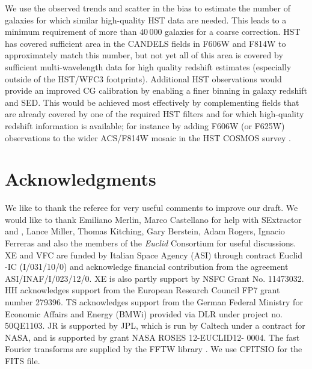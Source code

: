 \documentclass[useAMS,usenatbib]{mnras}
\begin{document}
We use the observed trends and scatter in the bias to estimate the number of galaxies for which similar high-quality HST data are needed. This leads to a minimum requirement of more than $40\,000$ galaxies for a coarse correction. HST has covered sufficient area in the CANDELS fields in F606W and
F814W to approximately match this number, but not yet all of this area is covered by sufficient
multi-wavelength data for high quality redshift estimates (especially outside of the HST/WFC3 footprints). Additional HST observations would provide an improved CG calibration by enabling a
finer binning in galaxy redshift and SED. This would be achieved most effectively by complementing
fields that are already covered by one of the required HST filters and for which high-quality redshift information is available; for instance by adding F606W (or F625W) observations to the wider ACS/F814W
mosaic in the HST COSMOS survey \citep{scoville07hst}.


\section*{Acknowledgments}

We like to thank the referee for very useful comments to improve our draft.
We would like to thank Emiliano Merlin, Marco Castellano for help with
{\sc SExtractor} and {}, Lance Miller, Thomas
Kitching, Gary Berstein, Adam Rogers, Ignacio Ferreras and also the
members of the {\it Euclid} Consortium for useful discussions. XE and VFC are
funded by Italian Space Agency (ASI) through contract Euclid -IC
(I/031/10/0) and acknowledge financial contribution from the agreement
ASI/INAF/I/023/12/0. XE is also partly support by NSFC Grant
No. 11473032. HH acknowledges support from the European Research
Council FP7 grant number 279396. TS acknowledges support from the
German Federal Ministry for Economic Affairs and Energy (BMWi)
provided via DLR under project no. 50QE1103.  JR is supported by JPL,
which is run by Caltech under a contract for NASA, and is supported by
grant NASA ROSES 12-EUCLID12- 0004. The fast Fourier transforms are
supplied by the FFTW library \citep{fftw05}. We use CFITSIO
\citep{1999ASPC..172..487P} for the FITS file.



\end{document}
